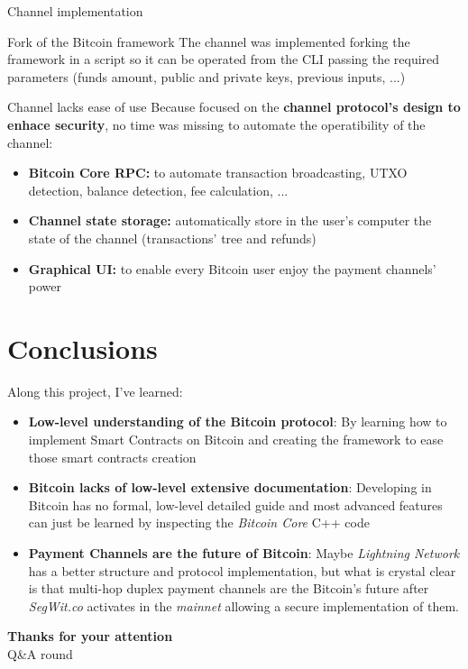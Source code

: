 \documentclass{beamer}
\begin{document}
\begin{frame}{Channel implementation}
 \begin{block}{Fork of the Bitcoin framework}
  The channel was implemented forking the framework in a script so it can be operated from the CLI passing the required parameters (funds amount, public and private keys, previous inputs, ...)
 \end{block}
 \pause
 \begin{alertblock}{Channel lacks ease of use}
  Because focused on the \textbf{channel protocol's design to enhace security}, no time was missing to automate the operatibility of the channel:
  \begin{itemize}
   \item \textbf{Bitcoin Core RPC:} to automate transaction broadcasting, UTXO detection, balance detection, fee calculation, ...
   \item \textbf{Channel state storage:} automatically store in the user's computer the state of the channel (transactions' tree and refunds)
   \item \textbf{Graphical UI:} to enable every Bitcoin user enjoy the payment channels' power
  \end{itemize}
 \end{alertblock}
\end{frame}
\section{Conclusions}
\begin{frame}
    Along this project, I've learned:
    \begin{itemize}[<+->]
        \item \textbf{Low-level understanding of the Bitcoin protocol}: By learning how to implement Smart Contracts on Bitcoin and creating the framework to ease those smart contracts creation
        \item \textbf{Bitcoin lacks of low-level extensive documentation}: Developing in Bitcoin has no formal, low-level detailed guide and most advanced features can just be learned by inspecting the \textit{Bitcoin Core} C++ code
        \item \textbf{Payment Channels are the future of Bitcoin}: Maybe \textit{Lightning Network} has a better structure and protocol implementation, but what is crystal clear is that multi-hop duplex payment channels are the Bitcoin's future after \textit{SegWit.co} activates in the \textit{mainnet} allowing a secure implementation of them.
    \end{itemize}
\end{frame}
\begin{frame}
    \begin{center}
        \textbf{\huge{Thanks for your attention}}\\
        \pause
        Q\&A round
    \end{center}
\end{frame}
\end{document}
